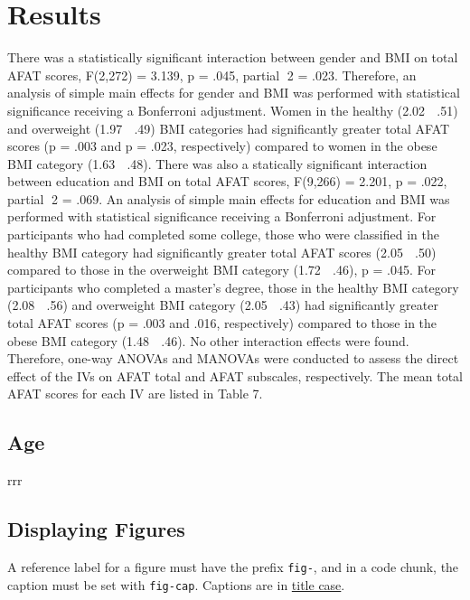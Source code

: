 \documentclass[
  jou,
  longtable,
  colorlinks=true,linkcolor=blue,citecolor=blue,urlcolor=blue]{apa7}
\begin{document}
\section{Results}\label{results}

There was a statistically significant interaction between gender and BMI
on total AFAT scores, F(2,272) = 3.139, p = .045, partial 2 = .023.
Therefore, an analysis of simple main effects for gender and BMI was
performed with statistical significance receiving a Bonferroni
adjustment. Women in the healthy (2.02  .51) and overweight (1.97 
.49) BMI categories had significantly greater total AFAT scores (p =
.003 and p = .023, respectively) compared to women in the obese BMI
category (1.63  .48). There was also a statically significant
interaction between education and BMI on total AFAT scores, F(9,266) =
2.201, p = .022, partial 2 = .069. An analysis of simple main effects
for education and BMI was performed with statistical significance
receiving a Bonferroni adjustment. For participants who had completed
some college, those who were classified in the healthy BMI category had
significantly greater total AFAT scores (2.05  .50) compared to those
in the overweight BMI category (1.72  .46), p = .045. For participants
who completed a master's degree, those in the healthy BMI category (2.08
 .56) and overweight BMI category (2.05  .43) had significantly
greater total AFAT scores (p = .003 and .016, respectively) compared to
those in the obese BMI category (1.48  .46). No other interaction
effects were found. Therefore, one-way ANOVAs and MANOVAs were conducted
to assess the direct effect of the IVs on AFAT total and AFAT subscales,
respectively. The mean total AFAT scores for each IV are listed in Table
7.

\subsection{Age}\label{age}

rrr

\subsection{Displaying Figures}\label{displaying-figures}

A reference label for a figure must have the prefix \texttt{fig-}, and
in a code chunk, the caption must be set with \texttt{fig-cap}. Captions
are in
\href{https://apastyle.apa.org/style-grammar-guidelines/capitalization/title-case}{title
case}.
\end{document}
